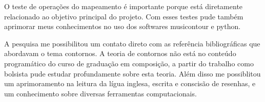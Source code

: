 \documentclass[11pt]{article}
\begin{document}
O teste de operações do mapeamento é importante porque está diretamente
relacionado ao objetivo principal do projeto. Com esses testes pude
também aprimorar meus conhecimentos no uso dos softwares musicontour
e python.

A pesquisa me possibilitou um contato direto com as referência bibliográficas que abordavam
o tema contornos.
A teoria de contornos não está no conteúdo programático do curso de
graduação em composição,
a partir do trabalho como bolsista pude estudar profundamente sobre esta teoria.
Além disso me
possiblitou um aprimoramento na leitura da lígua inglesa, escrita e
conscisão de resenhas, e um conhecimento sobre diversas ferramentas
computacionais.


\renewcommand{\refname}{Referências bibliográficas (máximo 15)}

\nocite{
  Friedmann1985,
  Friedmann1987,
  Morris1987,
  Marvin1987,
  Marvin1988,
  Polansky1992,
  Morris1993,
  Clifford1995,
  Quinn1997,
  Beard2003,
  Sampaio2008,
  Schultz2008,
  Schultz2009,
  Bor2009
}





\end{document}
